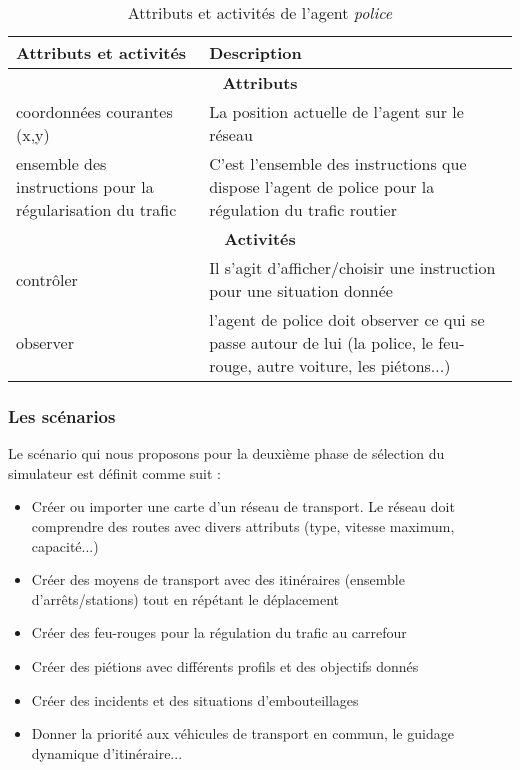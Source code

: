 \begin{table}[!ht]
\begin{center}
\caption{Attributs et activités de l'agent \textit{police}\label{tab:police}}
\begin{tabular}{|p{5cm}|p{10cm}|}
\hline
\bf Attributs et activités  &  \bf Description\\
\hline
\multicolumn{2}{|c|}{\bf Attributs}
\\
\hline
 coordonnées courantes  (x,y) & La position actuelle de l'agent sur le réseau
  \\ 
 \hline
ensemble des instructions pour la régularisation du trafic   & C'est l'ensemble des instructions que dispose l'agent de police pour la régulation du trafic routier
 \\
\hline
 \multicolumn{2}{|c|}{\bf Activités}
 \\
 \hline
 contrôler  & Il s'agit d'afficher/choisir une instruction pour une situation donnée 
  \\
 \hline
 observer & l'agent de police doit observer ce qui se passe autour de lui (la police, le feu-rouge, autre voiture, les piétons...)
 \\
\hline
\end{tabular}
\end{center}
\end{table}

\subsubsection{Les scénarios}
Le scénario qui nous proposons pour la deuxième phase de sélection du simulateur est définit comme suit :

\begin{itemize}
    \item Créer ou importer une carte d'un réseau de transport. Le réseau doit comprendre des routes avec divers attributs (type, vitesse maximum, capacité...)
    \item Créer des moyens de transport avec des itinéraires (ensemble d'arrêts/stations) tout en répétant le déplacement
    \item Créer des feu-rouges pour la régulation du trafic au carrefour
    \item Créer des piétions avec différents profils et des objectifs donnés
    \item Créer des incidents et des situations d'embouteillages
    \item Donner la priorité aux véhicules de transport en commun, le guidage dynamique d'itinéraire...
\end{itemize}